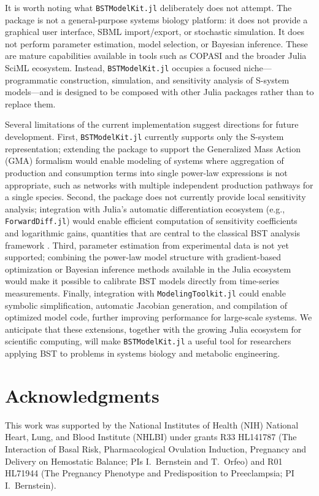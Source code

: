 \documentclass[11pt]{article}
\begin{document}
It is worth noting what \texttt{BSTModelKit.jl} deliberately does not attempt. The package is not a general-purpose systems biology platform: it does not provide a graphical user interface, SBML import/export, or stochastic simulation. It does not perform parameter estimation, model selection, or Bayesian inference. These are mature capabilities available in tools such as COPASI \citep{Hoops2006} and the broader Julia SciML ecosystem. Instead, \texttt{BSTModelKit.jl} occupies a focused niche---programmatic construction, simulation, and sensitivity analysis of S-system models---and is designed to be composed with other Julia packages rather than to replace them.

Several limitations of the current implementation suggest directions for future development. First, \texttt{BSTModelKit.jl} currently supports only the S-system representation; extending the package to support the Generalized Mass Action (GMA) formalism would enable modeling of systems where aggregation of production and consumption terms into single power-law expressions is not appropriate, such as networks with multiple independent production pathways for a single species. Second, the package does not currently provide local sensitivity analysis; integration with Julia's automatic differentiation ecosystem (e.g., \texttt{ForwardDiff.jl}) would enable efficient computation of sensitivity coefficients and logarithmic gains, quantities that are central to the classical BST analysis framework \citep{Savageau1976,Voit2000}. Third, parameter estimation from experimental data is not yet supported; combining the power-law model structure with gradient-based optimization or Bayesian inference methods available in the Julia ecosystem would make it possible to calibrate BST models directly from time-series measurements. Finally, integration with \texttt{ModelingToolkit.jl} could enable symbolic simplification, automatic Jacobian generation, and compilation of optimized model code, further improving performance for large-scale systems. We anticipate that these extensions, together with the growing Julia ecosystem for scientific computing, will make \texttt{BSTModelKit.jl} a useful tool for researchers applying BST to problems in systems biology and metabolic engineering.

\section*{Acknowledgments}
This work was supported by the National Institutes of Health (NIH) National Heart, Lung, and Blood Institute (NHLBI) under grants R33 HL141787 (The Interaction of Basal Risk, Pharmacological Ovulation Induction, Pregnancy and Delivery on Hemostatic Balance; PIs I.\ Bernstein and T.\ Orfeo) and R01 HL71944 (The Pregnancy Phenotype and Predisposition to Preeclampsia; PI I.\ Bernstein).
\end{document}
